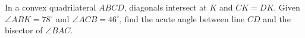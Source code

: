 In a convex quadrilateral $ABCD$, diagonals intersect at $K$ and $CK=DK$. Given $\angle ABK=78^{\circ}$ and $\angle ACB=46^{\circ}$, find the acute angle between line $CD$ and the bisector of $\angle BAC$.
